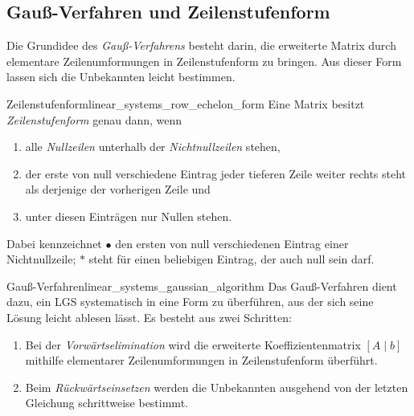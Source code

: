 \subsection{Gauß-Verfahren und Zeilenstufenform}
\label{subsec:linear_systems_gaussian_algorithm}

Die Grundidee des \emph{Gauß-Verfahrens} 
besteht darin, die erweiterte Matrix durch elementare Zeilenumformungen in
Zeilenstufenform zu bringen. Aus dieser Form lassen sich die Unbekannten leicht
bestimmen.

\begin{DefinitionBox}{Zeilenstufenform}{linear_systems_row_echelon_form}
  Eine Matrix besitzt \emph{Zeilenstufenform} 
  genau dann, wenn
  \begin{enumerate}[label=\arabic*.,itemsep=0.25em]
    \item alle \emph{Nullzeilen}  unterhalb der
      \emph{Nichtnullzeilen}  stehen,
    \item der erste von null verschiedene Eintrag jeder tieferen Zeile weiter
      rechts steht als derjenige der vorherigen Zeile und
    \item unter diesen Einträgen nur Nullen stehen.
  \end{enumerate}

  \begin{center}
  \end{center}
  Dabei kennzeichnet $\bullet$ den ersten von null verschiedenen Eintrag einer
  Nichtnullzeile; $\ast$ steht für einen beliebigen Eintrag, der auch null sein
  darf.
\end{DefinitionBox}


\begin{TheoremBox}{Gauß-Verfahren}{linear_systems_gaussian_algorithm}
  Das Gauß-Verfahren dient dazu, ein LGS systematisch in eine Form zu
  überführen, aus der sich seine Lösung leicht ablesen lässt. Es besteht aus
  zwei Schritten:
  \begin{enumerate}[label=\arabic*.,itemsep=0.3em]
    \item Bei der \emph{Vorwärtselimination} 
      wird die erweiterte Koeffizientenmatrix $[A\mid b]$ mithilfe elementarer
      Zeilenumformungen in Zeilenstufenform überführt.
    \item Beim \emph{Rückwärtseinsetzen} 
      werden die Unbekannten ausgehend von der letzten Gleichung schrittweise
      bestimmt.
  \end{enumerate}
  \begin{center}
  \end{center}
\end{TheoremBox}

